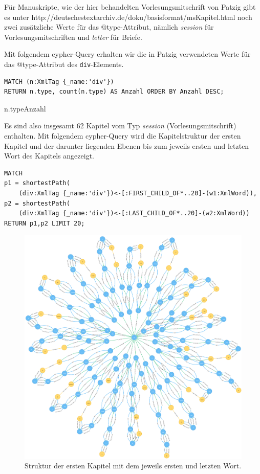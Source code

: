 Für Manuskripte, wie der hier behandelten Vorlesungsmitschrift von
Patzig gibt es unter
http://deutschestextarchiv.de/doku/basisformat/msKapitel.html noch zwei
zusätzliche Werte für das @type-Attribut, nämlich \emph{session} für
Vorlesungsmitschriften und \emph{letter} für Briefe.

Mit folgendem cypher-Query erhalten wir die in Patzig verwendeten Werte
für das @type-Attribut des \texttt{div}-Elements.

\begin{verbatim}
MATCH (n:XmlTag {_name:'div'})
RETURN n.type, count(n.type) AS Anzahl ORDER BY Anzahl DESC;
\end{verbatim}

\textbar n.type\textbar Anzahl\textbar{}

Es sind also insgesamt 62 Kapitel vom Typ \emph{session}
(Vorlesungsmitschrift) enthalten. Mit folgendem cypher-Query wird die
Kapitelstruktur der ersten Kapitel und der darunter liegenden Ebenen bis
zum jeweils ersten und letzten Wort des Kapitels angezeigt.

\begin{verbatim}
MATCH
p1 = shortestPath(
    (div:XmlTag {_name:'div'})<-[:FIRST_CHILD_OF*..20]-(w1:XmlWord)),
p2 = shortestPath(
    (div:XmlTag {_name:'div'})<-[:LAST_CHILD_OF*..20]-(w2:XmlWord))
RETURN p1,p2 LIMIT 20;
\end{verbatim}

\begin{figure}
\centering
\includegraphics{Bilder/TEI2Graph/div-Struktur-XmlWord.png}
\caption{Struktur der ersten Kapitel mit dem jeweils ersten und letzten
Wort.}
\end{figure}

